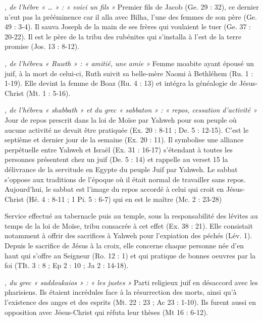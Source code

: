 \begin{multicols}{2}
\textit{, de l’hébre « … » : « voici un fils »}\newline
Premier fils de Jacob (Ge. 29 : 32), ce dernier n'eut pas la prééminence car il alla avec Bilha, l'une des femmes de son père (Ge. 49 : 3-4). Il sauva Joseph de la main de ses frères qui voulaient le tuer (Ge. 37 : 20-22). Il est le père de la tribu des rubénites qui s'installa à l'est de la terre promise (Jos. 13 : 8-12).

\textit{, de l'hébreu « Ruwth » : « amitié, une amie »}\newline
Femme moabite ayant épousé un juif, à la mort de celui-ci, Ruth suivit sa belle-mère Naomi à Bethléhem (Ru. 1 : 1-19). Elle devint la femme de Boaz (Ru. 4 : 13) et intégra la généalogie de Jésus-Christ (Mt. 1 : 5-16).

\textit{, de l'hébreu « shabbath » et du grec « sabbaton » : « repos, cessation d'activité »}\newline
Jour de repos prescrit dans la loi de Moïse par Yahweh pour son peuple où aucune activité ne devait être pratiquée (Ex. 20 : 8-11 ; De. 5 : 12-15). C'est le septième et dernier jour de la semaine (Ex. 20 : 11). Il symbolise une alliance perpétuelle entre Yahweh et Israël (Ex. 31 : 16-17) s'étendant à toutes les personnes présentent chez un juif (De. 5 : 14) et rappelle au verset 15 la délivrance de la servitude en Egypte du peuple Juif par Yahweh. Le sabbat s'oppose aux traditions de l'époque où il était normal de travailler sans repos. Aujourd'hui, le sabbat est l'image du repos accordé à celui qui croit en Jésus-Christ (Hé. 4 : 8-11 ; 1 Pi. 5 : 6-7) qui en est le maître (Mc. 2 : 23-28)

\textit{}\newline
Service effectué au tabernacle puis au temple, sous la responsabilité des lévites au temps de la loi de Moïse, tribu consacrée à cet effet (Ex. 38 : 21). Elle consistait notamment à offrir des sacrifices à Yahweh pour l'expiation des péchés (Lév. 1). Depuis le sacrifice de Jésus à la croix, elle concerne chaque personne née d'en haut qui s'offre au Seigneur (Ro. 12 : 1) et qui pratique de bonnes oeuvres par la foi (TIt. 3 : 8 ; Ep 2 : 10 ; Ja 2 : 14-18).

\textit{, du grec « saddoukaios » : « les justes »}\newline
Parti religieux juif en désaccord avec les pharisiens. Ils étaient incrédules face à la résurrection des morts, ainsi qu'à l'existence des anges et des esprits (Mt. 22 : 23 ; Ac 23 : 1-10). Ils furent aussi en opposition avec Jésus-Christ qui réfuta leur thèses (Mt 16 : 6-12).


\end{multicols}
